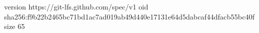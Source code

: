 version https://git-lfs.github.com/spec/v1
oid sha256:f9b22b2465bc71bd1ac7ad019ab49d440e17131e64d5dabcaf44dfacb55bc40f
size 65
